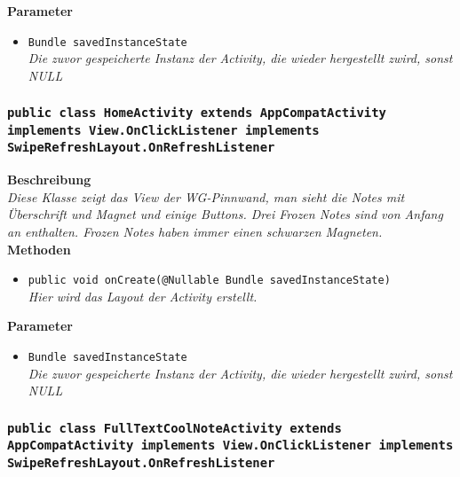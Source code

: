 \documentclass[a4paper]{scrreprt}
\begin{document}
                \textbf{Parameter}
                \begin{itemize}
        		\item\texttt{Bundle savedInstanceState}\\ 
                \textit{Die zuvor gespeicherte Instanz der Activity, die wieder hergestellt zwird, sonst NULL}\\
                \end{itemize} 
                
        \subsubsection{\texttt{public class HomeActivity extends AppCompatActivity implements View.OnClickListener implements SwipeRefreshLayout.OnRefreshListener}}
               
               	\textbf{Beschreibung} \\
      	        \textit{Diese Klasse zeigt das View der WG-Pinnwand, man sieht die Notes mit Überschrift und Magnet und einige Buttons. Drei Frozen Notes sind von Anfang an enthalten. Frozen Notes haben immer einen schwarzen Magneten.} \\
                
                \textbf{Methoden}
                \begin{itemize}
        		\item\texttt{{public void onCreate(@Nullable Bundle savedInstanceState)}}\\
                \textit{Hier wird das Layout der Activity erstellt.}\\
                \end{itemize}
                
                \textbf{Parameter}
                \begin{itemize}
        		\item\texttt{Bundle savedInstanceState}\\  
                \textit{Die zuvor gespeicherte Instanz der Activity, die wieder hergestellt zwird, sonst NULL}\\
                \end{itemize} 
                
       	\subsubsection{\texttt{public class FullTextCoolNoteActivity extends AppCompatActivity implements View.OnClickListener implements SwipeRefreshLayout.OnRefreshListener}}
               
\end{document}
